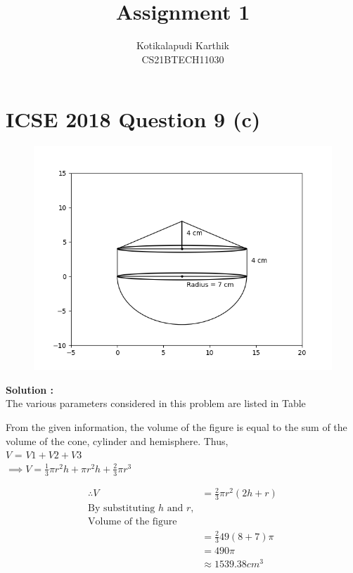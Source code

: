 \documentclass[journal,12pt,twocolumn]{IEEEtran}
\title{Assignment 1}
\author{Kotikalapudi Karthik \\
CS21BTECH11030}
\begin{document}
\maketitle

\section*{ICSE 2018 Question 9 (c)}
\begin{figure}[ht!]
	  \centering 
	  \includegraphics[width=\columnwidth]{question9c.png}
\end{figure}
\textbf{Solution :}\\
The various parameters considered in this problem are listed in Table
\begin{table}[ht!]
    \centering
    
\end{table}

From the given information, the volume of the figure is equal to the sum of the volume of the cone, cylinder and hemisphere. Thus,\\
$V$ = $V1 + V2 + V3$\\
$\implies V = \frac{1}{3} \pi r^2 h + \pi r^2 h + \frac{2}{3} \pi r^3$

\begin{align*}
    \therefore V&= \frac{2}{3} \pi r^2 (2h+r)\\
    \text{By substituting $h$ and $r$,}\\
    \text{Volume of the figure}\\
    &= \frac{2}{3} 49 (8+7) \pi\\
    &= 490 \pi\\ 
    &\approx 1539.38cm^3
\end{align*}
\end{document}
